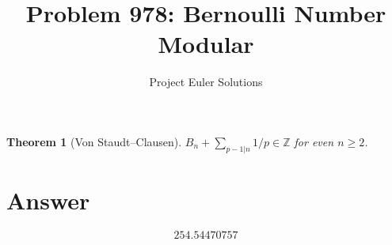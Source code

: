 \documentclass[11pt]{article}
\title{Problem 978: Bernoulli Number Modular}
\author{Project Euler Solutions}
\date{}
\newtheorem{theorem}{Theorem}
\begin{document}
\maketitle
\begin{theorem}[Von Staudt--Clausen]
$B_n + \sum_{p-1|n} 1/p \in \mathbb{Z}$ for even $n \ge 2$.
\end{theorem}
\section{Answer}

\[
\boxed{254.54470757}
\]
\end{document}
